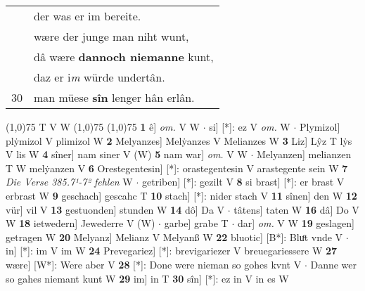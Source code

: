 \documentclass[8pt,a4paper,notitlepage]{article}
\begin{document}
\begin{table}[ht]
\begin{minipage}[t]{0.5\linewidth}
\begin{tabular}{rl}
 & der was er im bereite.\\ 
 & wære der junge man niht wunt,\\ 
 & dâ wære \textbf{dannoch niemanne} kunt,\\ 
 & daz er i\textit{m} würde undertân.\\ 
30 & man müese \textbf{sîn} lenger hân erlân.\\ 
\end{tabular}
\scriptsize
\line(1,0){75} \newline
T V W \newline
\line(1,0){75} \newline
\newline
\line(1,0){75} \newline
\textbf{1} ê] \textit{om.} V W  $\cdot$ si] [*]: ez V \textit{om.} W  $\cdot$ Plymizol] plẏmizol V plimizol W \textbf{2} Melyanzes] Melẏanzes V Melianzes W \textbf{3} Liz] Lŷz T lẏs V lis W \textbf{4} sîner] nam siner V (W) \textbf{5} nam war] \textit{om.} V W  $\cdot$ Melyanzen] melianzen T W melẏanzen V \textbf{6} Orestegentesin] [*]: orastegentesin V arastegente sein W \textbf{7} \textit{Die Verse 385.7¹-7² fehlen} W   $\cdot$ getriben] [*]: gezilt V \textbf{8} si brast] [*]: er brast V erbrast W \textbf{9} geschach] gescahc T \textbf{10} stach] [*]: nider stach V \textbf{11} sînen] den W \textbf{12} vür] vil V \textbf{13} gestuonden] stunden W \textbf{14} dô] Da V  $\cdot$ tâtens] taten W \textbf{16} dâ] Do V W \textbf{18} ietwedern] Jewederre V (W)  $\cdot$ garbe] grabe T  $\cdot$ dar] \textit{om.} V W \textbf{19} geslagen] getragen W \textbf{20} Melyanz] Melianz V Melyanß W \textbf{22} bluotic] [B*]: Bluͦt vnde V  $\cdot$ in] [*]: im V im W \textbf{24} Prevegariez] [*]: brevigariezer V breuegariessere W \textbf{27} wære] [W*]: Were aber V \textbf{28} [*]: Done were nieman so gohes kvnt V  $\cdot$ Danne wer so gahes niemant kunt W \textbf{29} im] in T \textbf{30} sîn] [*]: ez in V in es W \newline
\end{minipage}
\end{table}
\end{document}
